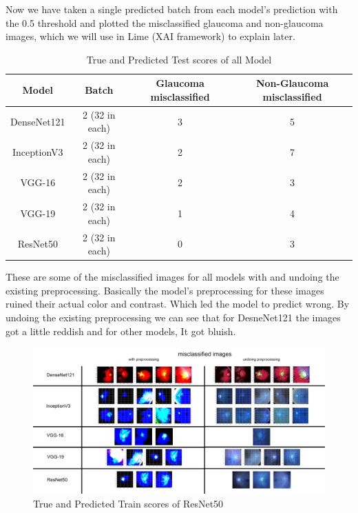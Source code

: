 \vspace{5mm}
Now we have taken a single predicted batch from each model’s prediction with the 0.5 threshold and plotted the misclassified glaucoma and non-glaucoma images, which we will use in Lime (XAI framework) to explain later.

\begin{table}[hbt!]
\begin{tabular}{|c | c | c| c |}
\hline
Model & Batch & Glaucoma misclassified & Non-Glaucoma misclassified\\
\hline
DenseNet121 & 2 (32 in each) & 3 &  5\\
\hline
InceptionV3 & 2 (32 in each) & 2 & 7\\
\hline
VGG-16 & 2 (32 in each) & 2 & 3\\
\hline
VGG-19 & 2 (32 in each) & 1 & 4\\
\hline
ResNet50 & 2 (32 in each) & 0 & 3\\
\hline

\end{tabular}
\caption{True and Predicted Test scores of all Model}
\label{tab:True and Predicted Test scores of all Model}
\end{table}

\newpage
\vspace{5mm}
These are some of the misclassified images for all models with and undoing the existing preprocessing. Basically the model’s preprocessing for these images ruined their actual color and contrast.  Which led the model to predict wrong. By undoing the existing preprocessing we can see that for DesneNet121 the images got a little reddish and for other models, It got bluish.

\vspace{5mm}
\begin{figure}[hbt!]
\centering
\includegraphics[scale=0.5]{images/fig-41.png}
\caption{True and Predicted Train scores of ResNet50}
\label{fig:x True and Predicted Train scores of ResNet50}
\end{figure}

